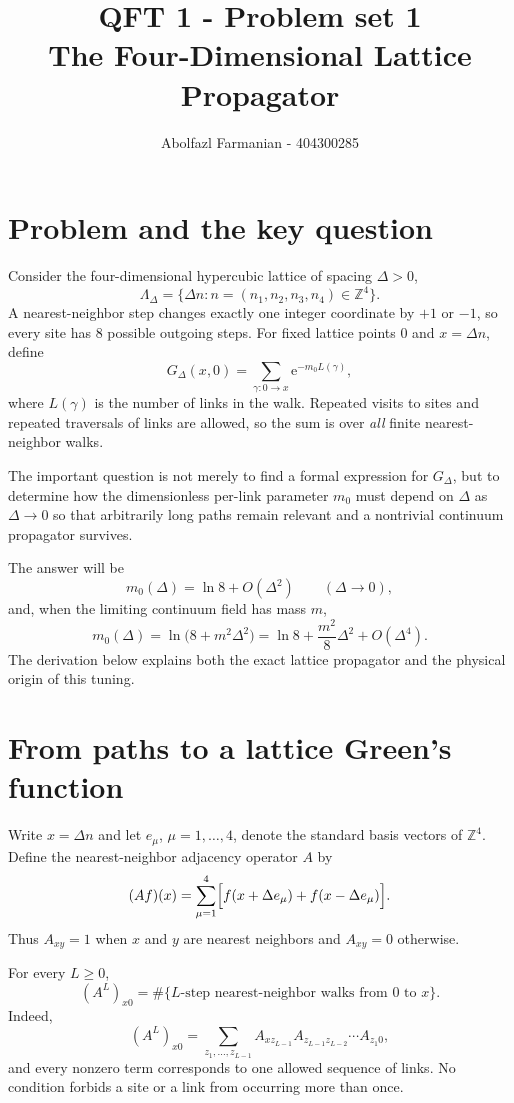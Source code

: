 \documentclass[11pt]{article}
\title{QFT 1 - Problem set 1 \\
	
	\large The Four-Dimensional Lattice Propagator}
\author{Abolfazl Farmanian - 404300285}
\date{}
\newcommand{\Z}{\mathbb Z}
\newcommand{\e}{\mathrm e}
\begin{document}
	\maketitle
	
	\section{Problem and the key question}
	Consider the four-dimensional hypercubic lattice of spacing $\Delta>0$,
	\[
	\Lambda_\Delta=\{\Delta n:n=(n_1,n_2,n_3,n_4)\in\Z^4\}.
	\]
	A nearest-neighbor step changes exactly one integer coordinate by $+1$ or $-1$, so every site has $8$ possible outgoing steps. For fixed lattice points $0$ and $x=\Delta n$, define
	\[
	G_\Delta(x,0)
	=\sum_{\gamma:0\to x}\e^{-m_0L(\gamma)},
	\]
	where $L(\gamma)$ is the number of links in the walk. Repeated visits to sites and repeated traversals of links are allowed, so the sum is over \emph{all} finite nearest-neighbor walks.
	
	The important question is not merely to find a formal expression for $G_\Delta$, but to determine how the dimensionless per-link parameter $m_0$ must depend on $\Delta$ as $\Delta\to0$ so that arbitrarily long paths remain relevant and a nontrivial continuum propagator survives.
	
	The answer will be
	\[
	\boxed{
		m_0(\Delta)=\ln 8+O(\Delta^2)
		\qquad(\Delta\to0),
	}
	\]
	and, when the limiting continuum field has mass $m$,
	\[
	\boxed{
		m_0(\Delta)=\ln\!\bigl(8+m^2\Delta^2\bigr)
		=\ln8+\frac{m^2}{8}\Delta^2+O(\Delta^4).}
	\]
	The derivation below explains both the exact lattice propagator and the physical origin of this tuning.
	
	\section{From paths to a lattice Green's function}
	Write $x=\Delta n$ and let $e_\mu$, $\mu=1,\dots,4$, denote the standard basis vectors of $\Z^4$. Define the nearest-neighbor adjacency operator $A$ by
	\begin{equation}
		\label{eq:A}
		(Af)(x)=\sum_{\mu=1}^4\Bigl[f(x+\Delta e_\mu)+f(x-\Delta e_\mu)\Bigr].
	\end{equation}
	Thus $A_{xy}=1$ when $x$ and $y$ are nearest neighbors and $A_{xy}=0$ otherwise.
	
	For every $L\ge0$,
	\begin{equation}
		\label{eq:walk-count}
		(A^L)_{x0}
		=\#\{\text{$L$-step nearest-neighbor walks from $0$ to $x$}\}.
	\end{equation}
	Indeed,
	\[
	(A^L)_{x0}
	=\sum_{z_1,\ldots,z_{L-1}}
	A_{xz_{L-1}}A_{z_{L-1}z_{L-2}}\cdots A_{z_1 0},
	\]
	and every nonzero term corresponds to one allowed sequence of links. No condition forbids a site or a link from occurring more than once.
	
\end{document}
